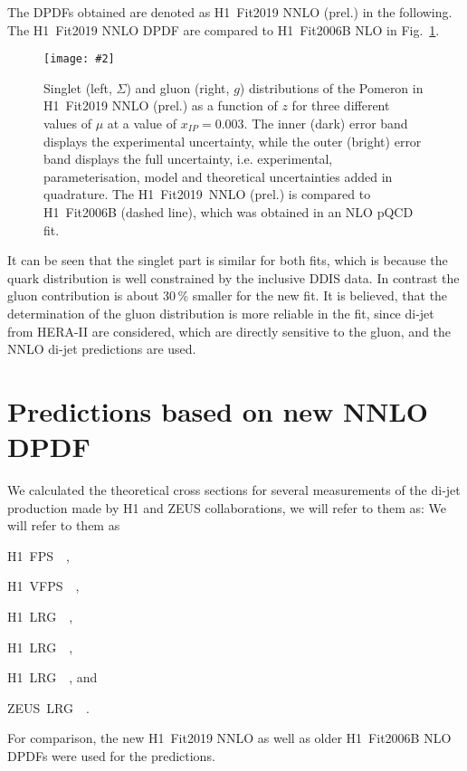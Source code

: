\documentclass{PoS}
\makeatletter
\newcommand{\IP}{I\!\!P}
\newcommand{\GeV}{\ensuremath{\mathrm{GeV}}\xspace}
\newcommand{\includegraphicss}[2][]{\texttt{[image: \#2]}}
\newcommand*{\rom}[1]{\expandafter\@slowromancap\romannumeral #1@}
\newcommand{\HERAI} {\protect\scalebox{0.8}{(HERA~\rom{1})}}
\newcommand{\HERAII} {\protect\scalebox{0.8}{(HERA~\rom{2})}}
\newcommand{\LowEP} {\protect\scalebox{0.8}{($300\,\GeV$)}}
\newcommand{\HLRG}  {H1~LRG~\HERAII\xspace}
\newcommand{\HVFPS} {H1~VFPS~\HERAII\xspace}
\newcommand{\HFPS}  {H1~FPS~\HERAII\xspace}
\newcommand{\HLRGI} {H1~LRG~\HERAI\xspace}
\newcommand{\ZLRG}  {ZEUS~LRG~\HERAI\xspace}
\newcommand{\HLRGEp}{H1~LRG~\LowEP\xspace}
\makeatother
\begin{document}
The DPDFs obtained are denoted as H1~Fit2019 NNLO (prel.) in the following. The H1~Fit2019 NNLO DPDF are compared to H1~Fit2006B NLO \cite{Aktas:2006hy} in Fig.~\ref{figDPDF}.
\begin{figure}[tbhp]
\centering
\includegraphicss[trim={0cm 0.5cm 0 1.5cm},clip,width=.7\textwidth]{{{plots/H1prelim-19-013.fig1}}}
\caption{ Singlet (left, $\Sigma$) and gluon (right, $g$) distributions of the Pomeron in H1~Fit2019 NNLO (prel.) as a function of $z$ for three different values of $\mu$ at a value of $x_{\IP} = 0.003$. The inner (dark) error band displays the experimental uncertainty, while the outer (bright) error band displays the full uncertainty, i.e. experimental, parameterisation, model and theoretical uncertainties added in quadrature. The H1~Fit2019~NNLO (prel.) is compared to H1~Fit2006B (dashed line), which was obtained in an NLO pQCD fit.}
\label{figDPDF}
\end{figure}
%
It can be seen that the singlet part is similar for both fits, which is because the quark distribution is well constrained by the inclusive DDIS data.
In contrast the gluon contribution is about 30\,\% smaller for the new fit. It is believed, that the determination of the gluon distribution is more reliable in the fit, since di-jet from HERA-II are considered, which are directly sensitive to the gluon, and the NNLO di-jet predictions are used.


\section{Predictions based on new NNLO DPDF}

We calculated the theoretical cross sections for several measurements of the di-jet production made by H1 and ZEUS collaborations, we will refer to them as:
We will refer to them as
\begin{compactitem}
\item \HFPS ~\cite{Aaron:2011mp},
\item \HVFPS~\cite{Andreev:2015cwa},
\item \HLRG ~\cite{Andreev:2014yra},
\item \HLRGI~\cite{Aktas:2007bv},
\item\HLRGEp~\cite{Aktas:2007hn}, and
\item\ZLRG~\cite{Chekanov:2007aa}.
\end{compactitem}
%
For comparison, the new H1~Fit2019 NNLO as well as older H1~Fit2006B NLO DPDFs \cite{Aktas:2006hy} were used for the predictions.
\end{document}
